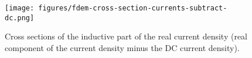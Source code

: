 \begin{figure}
    \begin{center}
    \texttt{[image: figures/fdem-cross-section-currents-subtract-dc.png]}
    \end{center}
\caption{
    Cross sections of the inductive part of the real current density (real component of the current density minus the DC current density).
}
\label{fig:fdem-cross-section-currents-subtract-dc}
\end{figure}



